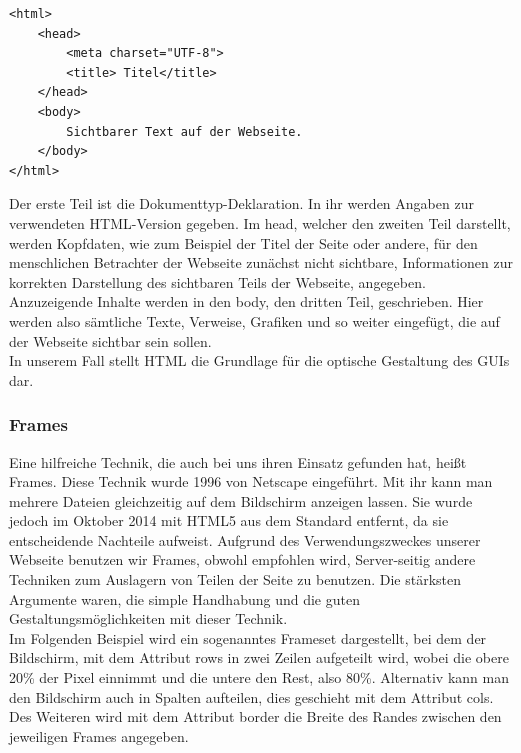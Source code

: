\documentclass[12pt,a4paper,bibliography=totocnumbered,listof=totocnumbered]{scrartcl}
\begin{document}
\vspace{1em}
\begin{lstlisting}[caption= Beispiel für ein einfaches HTML-Dokument, label=lst:HTML]
<html>
	<head>
		<meta charset="UTF-8">		
		<title> Titel</title>
	</head>
	<body>
		Sichtbarer Text auf der Webseite.
	</body>
</html>
\end{lstlisting}

Der erste Teil ist die Dokumenttyp-Deklaration. In ihr werden Angaben zur verwendeten HTML-Version gegeben. Im \glqq head\grqq , welcher den zweiten Teil darstellt, werden  Kopfdaten, wie zum Beispiel der Titel der Seite oder andere, für den menschlichen Betrachter der Webseite zunächst nicht sichtbare, Informationen zur korrekten Darstellung des sichtbaren Teils der Webseite, angegeben.\cite{HTML/Kopfdaten} Anzuzeigende Inhalte werden in den \glqq body\grqq{}, den dritten Teil, geschrieben. Hier werden also sämtliche Texte, Verweise, Grafiken und so weiter eingefügt, die auf der Webseite sichtbar sein sollen.\cite{HTML/Dokumentstruktur_und_Aufbau} \\
In unserem Fall stellt HTML die Grundlage für die optische Gestaltung des GUIs dar.

\subsubsection{Frames}
\label{sec:Frames}
Eine hilfreiche Technik, die auch bei uns ihren Einsatz gefunden hat, heißt Frames. Diese Technik wurde 1996 von Netscape eingeführt. Mit ihr kann man mehrere Dateien gleichzeitig auf dem Bildschirm anzeigen lassen.\cite{HTML/Frames} Sie wurde jedoch im Oktober 2014 mit HTML5\cite{HTML5} aus dem Standard entfernt, da sie entscheidende Nachteile aufweist. Aufgrund des Verwendungszweckes unserer Webseite benutzen wir Frames, obwohl empfohlen wird, Server-seitig andere Techniken zum Auslagern von Teilen der Seite zu benutzen.\cite{HTML/Frames} Die stärksten Argumente waren, die simple Handhabung und die guten Gestaltungsmöglichkeiten mit dieser Technik. \\
Im Folgenden Beispiel wird ein sogenanntes Frameset dargestellt, bei dem der Bildschirm, mit dem Attribut \glqq rows\grqq{} in zwei Zeilen aufgeteilt wird, wobei die obere 20\% der Pixel einnimmt und die untere den Rest, also 80\%. Alternativ kann man den Bildschirm auch in Spalten aufteilen, dies geschieht mit dem Attribut \glqq cols\grqq . Des Weiteren wird mit dem Attribut \glqq border\grqq{} die Breite des Randes zwischen den jeweiligen Frames angegeben.
\end{document}
